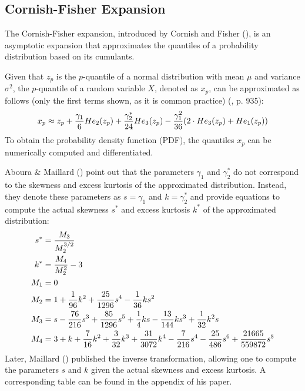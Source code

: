 \subsection{Cornish-Fisher Expansion}

The Cornish-Fisher expansion, introduced by Cornish and Fisher (\citeyear{cornishMomentsCumulantsSpecification1938}), is an asymptotic expansion that approximates the quantiles of a probability distribution based on its cumulants.

Given that $z_p$ is the $p$-quantile of a normal distribution with mean $\mu$ and variance $\sigma^2$, the $p$-quantile of a random variable $X$, denoted as $x_p$, can be approximated as follows (only the first terms shown, as it is common practice) (\cite{abramowitzHandbookMathematicalFunctions1968}, p. 935):
\begin{align}
    x_p \approx z_p + \frac{\gamma_1}{6}He_2(z_p) + \frac{\gamma_2^*}{24}He_3(z_p) - \frac{\gamma_1^2}{36}(2\cdot He_3(z_p) + He_1(z_p)) \notag
\end{align}
To obtain the probability density function (PDF), the quantiles $x_p$ can be numerically computed and differentiated.

Aboura & Maillard (\citeyear{abouraOptionPricingSkewness2016}) point out that the parameters $\gamma_1$ and $\gamma_2^*$ do not correspond to the skewness and excess kurtosis of the approximated distribution. Instead, they denote these parameters as $s = \gamma_1$ and $k = \gamma_2^*$ and provide equations to compute the actual skewness $s^*$ and excess kurtosis $k^*$ of the approximated distribution:
\begin{align}
    s^* &= \frac{M_3}{M_{2}^{3/2}} \notag \\
    k^* &= \frac{M_4}{M_{2}^2} - 3 \notag \\
    M_1 &= 0 \\
    M_2 &= 1 + \frac{1}{96}k^2 + \frac{25}{1296}s^4 - \frac{1}{36}ks^2 \\
    M_3 &= s - \frac{76}{216}s^3 + \frac{85}{1296}s^5 + \frac{1}{4}ks - \frac{13}{144}ks^3 + \frac{1}{32}k^2s \\
    M_4 &= 3 + k + \frac{7}{16}k^2 + \frac{3}{32}k^3 + \frac{31}{3072}k^4 - \frac{7}{216}s^4 - \frac{25}{486}s^6 + \frac{21665}{559872}s^8 \notag
\end{align}
Later, Maillard (\citeyear{maillardUserGuideCornish2018}) published the inverse transformation, allowing one to compute the parameters $s$ and $k$ given the actual skewness and excess kurtosis. A corresponding table can be found in the appendix of his paper.

